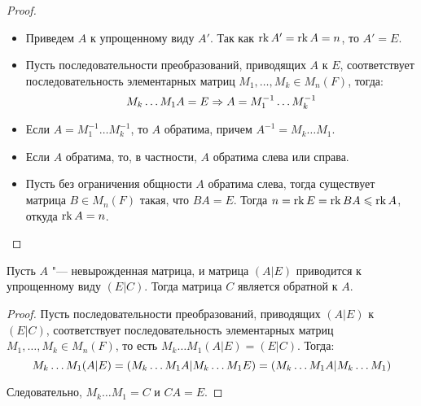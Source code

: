     \begin{proof}~
    	\begin{itemize}
    		\item{} Приведем $A$ к упрощенному виду $A'$. Так как $\operatorname{rk}{A'} = \operatorname{rk}{A} = n$, то $A' = E$.
    		
    		\item{} Пусть последовательности преобразований, приводящих $A$ к $E$, соответствует последовательность элементарных матриц $M_1, \dots, M_{k} \in M_n(F)$, тогда:
    		\[M_k\dots M_1A = E \Rightarrow A = M_1^{-1}\dots M_k^{-1}\]
    		
    		\item{} Если $A = M_1^{-1}\dots M_k^{-1}$, то $A$ обратима, причем $A^{-1} = M_k\dots M_1$.
    		
    		\item{} Если $A$ обратима, то, в частности, $A$ обратима слева или справа.
    		
    		\item{} Пусть без ограничения общности $A$ обратима слева, тогда существует матрица $B \in M_n(F)$ такая, что $BA = E$. Тогда $n = \rk{E} = \rk{BA} \hm{\le} \rk{A}$, откуда $\operatorname{rk}{A} = n$.\qedhere
    	\end{itemize}
    \end{proof}
    
    \begin{corollary}
     	Пусть $A$ "--- невырожденная матрица, и матрица $(A|E)$ приводится к упрощенному виду $(E|C)$. Тогда матрица $C$ является обратной к $A$.
    \end{corollary}
    
    \begin{proof}
    	Пусть последовательности преобразований, приводящих $(A|E)$ к $(E|C)$, соответствует последовательность элементарных матриц $M_1, \dots, M_{k} \in M_n(F)$, то есть $M_k\dots M_1(A|E) = (E|C)$. Тогда:
    	\[M_k\dots M_1(A|E) \hm{=} (M_k\dots M_1A|M_k\dots M_1E) = (M_k\dots M_1A|M_k\dots M_1)\]
    	
    	Следовательно, $M_k\dots M_1 = C$ и $CA = E$.
    \end{proof}
    